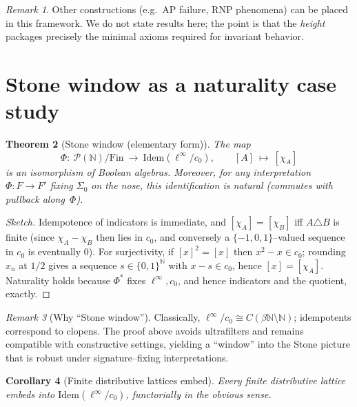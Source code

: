 \documentclass[11pt]{article}
\newtheorem{theorem}{Theorem}[section]
\newtheorem{corollary}[theorem]{Corollary}
\theoremstyle{definition}
\theoremstyle{remark}
\newtheorem{remark}[theorem]{Remark}
\newcommand{\N}{\mathbb{N}}
\newcommand{\cnull}{c_0}
\newcommand{\linf}{\ell^\infty}
\newcommand{\SigmaZero}{\Sigma_{0}}
\begin{document}
\begin{remark}
Other constructions (e.g.\ AP failure, RNP phenomena) can be placed in this framework. We do not state results here; the point is that the \emph{height} packages precisely the minimal axioms required for invariant behavior.
\end{remark}

\section{Stone window as a naturality case study}\label{sec:stone}

\begin{theorem}[Stone window (elementary form)]\label{thm:stone}
The map
\[
  \Phi:\ \mathcal{P}(\N)/\mathrm{Fin} \ \longrightarrow\ \mathrm{Idem}(\linf/\cnull),\qquad
  [A]\ \longmapsto\ [\chi_A]
\]
is an isomorphism of Boolean algebras. Moreover, for any interpretation \(\Phi:F\to F'\) fixing \(\SigmaZero\) on the nose, this identification is natural (commutes with pullback along~\(\Phi\)).
\end{theorem}

\begin{proof}[Sketch]
Idempotence of indicators is immediate, and \([\chi_A]=[\chi_B]\) iff \(A\triangle B\) is finite (since \(\chi_A-\chi_B\) then lies in \(\cnull\), and conversely a $\{-1,0,1\}$--valued sequence in \(\cnull\) is eventually $0$). For surjectivity, if \([x]^2=[x]\) then \(x^2-x\in\cnull\); rounding $x_n$ at \(1/2\) gives a sequence \(s\in\{0,1\}^\N\) with \(x-s\in\cnull\), hence \([x]=[\chi_A]\). Naturality holds because \(\Phi^*\) fixes \(\linf,\cnull\), and hence indicators and the quotient, exactly.
\end{proof}

\begin{remark}[Why ``Stone window'']
Classically, \(\linf/\cnull\cong C(\beta\N\setminus\N)\); idempotents correspond to clopens. The proof above avoids ultrafilters and remains compatible with constructive settings, yielding a ``window'' into the Stone picture that is robust under signature--fixing interpretations.
\end{remark}

\begin{corollary}[Finite distributive lattices embed]
Every finite distributive lattice embeds into \(\mathrm{Idem}(\linf/\cnull)\), functorially in the obvious sense. 
\end{corollary}
\end{document}
